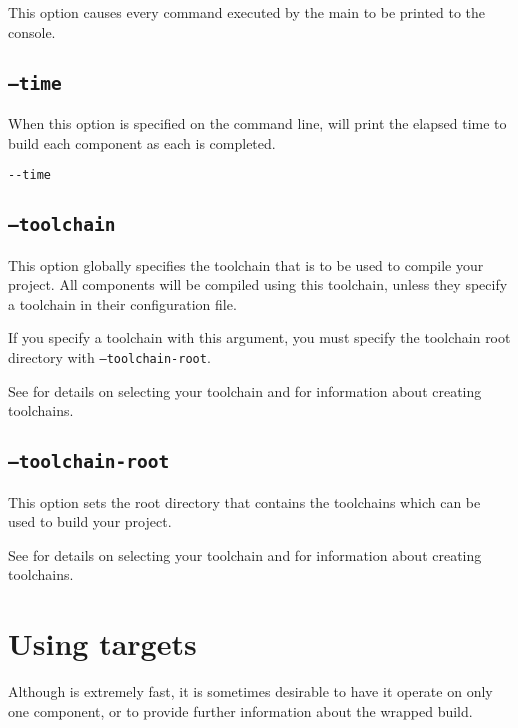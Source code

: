 This option causes every command executed by the main \makefile to be
printed to the console.

\subsection{\texttt{--time}}

When this option is specified on the command line, \lmsbw will print
the elapsed time to build each component as each is completed.

\begin{verbatim}
--time
\end{verbatim}

\subsection{\texttt{--toolchain}}\label{usinglmsbw:toolchain}

This option globally specifies the toolchain that is to be used to
compile your project.  All components will be compiled using this
toolchain, unless they specify a toolchain in their configuration
file.

If you specify a toolchain with this argument, you must specify the
toolchain root directory with \texttt{--toolchain-root}.

See  for details on selecting your
toolchain and  for information
about creating toolchains.

\subsection{\texttt{--toolchain-root}}\label{usinglmsbw:toolchain-root}

This option sets the root directory that contains the toolchains which
can be used to build your project.

See  for details on selecting your
toolchain and  for information
about creating toolchains.

\section{Using \lmsbw \make targets}\label{lmsbw:target:verbs}

Although \lmsbw is extremely fast, it is sometimes desirable to have
it operate on only one component, or to provide further information
about the wrapped build.

